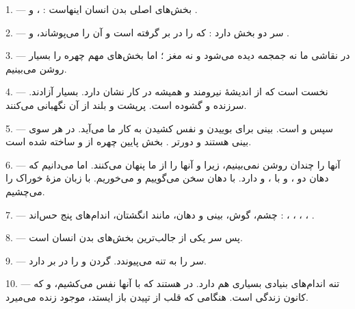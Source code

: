 \VUsaut{4.0mm}
\VUsaut{2.0mm}

\VUsaut{2.4mm}
\VUsaut{3.0mm}

\VUsaut{3.0mm}

1. --- بخش‌های اصلی بدن انسان اینهاست : ،  و
.

2. --- سر دو بخش دارد :  که  را در بر گرفته
است و  آن را می‌پوشاند، و .

3. --- در نقاشی ما نه جمجمه دیده می‌شود و نه مغز ؛ اما بخش‌های مهم چهره
را بسیار روشن می‌بینیم.

4. --- نخست  است که از اندیشهٔ نیرومند و همیشه در کار
نشان دارد.  بسیار آزادند.  سرزنده و
گشوده است.  پرپشت و  بلند از آن نگهبانی
می‌کنند.

5. --- سپس  و  است. بینی برای
بوییدن و نفس کشیدن به کار ما می‌آید. در هر سوی بینی 
هستند و دورتر . بخش پایین چهره از  و
 ساخته شده است.

6. --- آنها را چندان روشن نمی‌بینیم، زیرا  و  آنها را از ما پنهان می‌کنند. اما می‌دانیم که دهان دو ،
 و  با ، و
 دارد. با دهان سخن می‌گوییم و می‌خوریم. با زبان مزهٔ
خوراک را می‌چشیم.

7. --- چشم، گوش، بینی و دهان، مانند انگشتان، اندام‌های پنج حس‌اند :
، ، ، ،
.

8. --- پس سر یکی از جالب‌ترین بخش‌های بدن انسان است.

\VUsaut{4.4mm}
\VUsaut{3.0mm}

9. ---  سر را به تنه می‌پیوندد. گردن  و
 را در بر دارد.

10. --- تنه اندام‌های بنیادی بسیاری هم دارد. در 
 هستند که با آنها نفس می‌کشیم، و  که کانون
زندگی است. هنگامی که قلب از تپیدن باز ایستد، موجود زنده می‌میرد.

